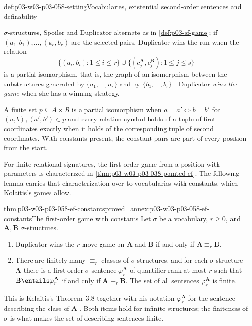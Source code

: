 \begin{hbconvention}{def:p03-w03-p03-058-setting}{Vocabularies, existential second-order sentences and definability}
\begin{enumerate}
      \(\sigma\)-structures, Spoiler and Duplicator alternate as in
      \cref{def:p03-ef-game}; if \((a_1,b_1),\ldots,(a_r,b_r)\) are the
      selected pairs, Duplicator wins the run when the relation
      \[
       \{(a_i,b_i):1\le i\le r\}\cup\{(c_j^{\mathbf A},c_j^{\mathbf B}):
       1\le j\le s\}
      \]
      is a partial isomorphism, that is, the graph of an isomorphism between
      the substructures generated by \(\{a_1,\ldots,a_r\}\) and by
      \(\{b_1,\ldots,b_r\}\) \cite[Def.~3.1, p.~9]{Kolaitis2003ExpressivePowerNotes}.
      Duplicator \emph{wins the game} when she has a winning strategy.
\end{enumerate}
A finite set \(p\subseteq A\times B\) is a partial isomorphism when
\(a=a'\iff b=b'\) for \((a,b),(a',b')\in p\) and every relation symbol
holds of a tuple of first coordinates exactly when it holds of the
corresponding tuple of second coordinates. With constants present, the
constant pairs are part of every position from the start.
\end{hbconvention}

For finite relational signatures, the first-order game from a position
with parameters is characterized in \cref{thm:p03-w03-p03-038-pointed-ef}.
The following lemma carries that characterization over to vocabularies with
constants, which Kolaitis's games allow.

\begin{hblemma}{thm:p03-w03-p03-058-ef-constants}{proved=annex:p03-w03-p03-058-ef-constants}{The first-order game with constants}
Let \(\sigma\) be a vocabulary, \(r\ge0\), and \(\mathbf A,\mathbf B\)
\(\sigma\)-structures.
\begin{enumerate}
\item Duplicator wins the \(r\)-move game on \(\mathbf A\) and \(\mathbf B\)
      if and only if \(\mathbf A\equiv_r\mathbf B\).
\item There are finitely many \(\equiv_r\)-classes of \(\sigma\)-structures,
      and for each \(\sigma\)-structure \(\mathbf A\) there is a first-order
      \(\sigma\)-sentence \(\varphi^{\mathbf A}_r\) of quantifier rank at
      most \(r\) such that \(\mathbf B\entails\varphi^{\mathbf A}_r\) if and only
      if \(\mathbf A\equiv_r\mathbf B\). The set of all sentences
      \(\varphi^{\mathbf A}_r\) is finite.
\end{enumerate}
\end{hblemma}

This is Kolaitis's Theorem~3.8 together with his notation
\(\varphi^{\mathbf A}_r\) for the sentence describing the class of
\(\mathbf A\) \cite[Thm.~3.8, p.~11; Def.~3.13, p.~13]{Kolaitis2003ExpressivePowerNotes}.
Both items hold for infinite structures; the finiteness of \(\sigma\) is what
makes the set of describing sentences finite.

